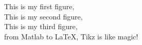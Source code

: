 \documentclass{article}
\begin{document}

This is my first figure, \\
 

This is my second figure, \\


This is my third figure, \\


from Matlab to \LaTeX, Tikz is like magic!
\end{document}
